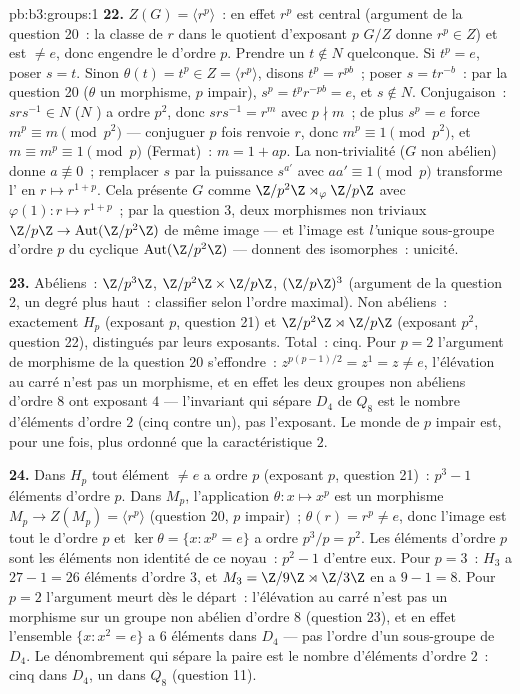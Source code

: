 \begin{solution}{pb:b3:groups:1}
\textbf{22.} $Z(G) = \langle r^p\rangle$~: en effet $r^p$ est
central (argument de la question 20~: la classe de $r$ dans le
quotient d'exposant $p$ $G/Z$ donne $r^p \in Z$) et est $\neq
e$, donc engendre le  d'ordre $p$. Prendre un $t \notin N$
quelconque. Si $t^p = e$, poser $s = t$. Sinon $\theta(t) =
t^p \in Z = \langle r^p\rangle$, disons $t^p = r^{pb}$~; poser
$s = tr^{-b}$~: par la question 20 ($\theta$ un morphisme, $p$
impair), $s^p = t^pr^{-pb} = e$, et $s \notin N$. Conjugaison~:
$srs^{-1} \in N$ ($N$ ) a ordre $p^2$, donc $srs^{-1} =
r^m$ avec $p \nmid m$~; de plus $s^p = e$ force $m^p \equiv m
\pmod{p^2}$ --- conjuguer $p$ fois renvoie $r$, donc $m^p
\equiv 1 \pmod{p^2}$, et $m \equiv m^p \equiv 1 \pmod p$
(Fermat)~: $m = 1 + ap$. La non-trivialité ($G$ non abélien)
donne $a \not\equiv 0$~; remplacer $s$ par la puissance
$s^{a'}$ avec $aa' \equiv 1 \pmod p$ transforme l' en $r
\mapsto r^{1+p}$. Cela présente $G$ comme
$\Z/p^2\Z\rtimes_\varphi\Z/p\Z$ avec $\varphi(1)\colon r
\mapsto r^{1+p}$~; par la question 3, deux morphismes non
triviaux $\Z/p\Z \to \operatorname{Aut}(\Z/p^2\Z)$ de même
image --- et l'image est \emph{l'}unique sous-groupe d'ordre $p$
du cyclique $\operatorname{Aut}(\Z/p^2\Z)$ --- donnent des
 isomorphes~: unicité.

\textbf{23.} Abéliens~: $\Z/p^3\Z$, $\Z/p^2\Z\times\Z/p\Z$,
$(\Z/p\Z)^3$ (argument de la question 2, un degré plus haut~:
classifier selon l'ordre maximal). Non abéliens~: exactement
$H_p$ (exposant $p$, question 21) et $\Z/p^2\Z\rtimes\Z/p\Z$
(exposant $p^2$, question 22), distingués par leurs exposants.
Total~: cinq. Pour $p = 2$ l'argument de morphisme de la
question 20 s'effondre~: $z^{p(p-1)/2} = z^{1} = z \neq e$,
l'élévation au carré n'est pas un morphisme, et en effet les
deux groupes non abéliens d'ordre $8$ ont exposant $4$ ---
l'invariant qui sépare $D_4$ de $Q_8$ est le nombre d'éléments
d'ordre $2$ (cinq contre un), pas l'exposant. Le monde de $p$
impair est, pour une fois, plus ordonné que la caractéristique
$2$.

\textbf{24.} Dans $H_p$ tout élément $\neq e$ a ordre $p$
(exposant $p$, question 21)~: $p^3 - 1$ éléments d'ordre $p$.
Dans $M_p$, l'application $\theta \colon x \mapsto x^p$ est un
morphisme $M_p \to Z(M_p) = \langle r^p\rangle$ (question 20,
$p$ impair)~; $\theta(r) = r^p \neq e$, donc l'image est tout le
 d'ordre $p$ et $\ker\theta = \{x : x^p = e\}$ a ordre
$p^3/p = p^2$. Les éléments d'ordre $p$ sont les éléments non
identité de ce noyau~: $p^2 - 1$ d'entre eux. Pour $p = 3$~:
$H_3$ a $27 - 1 = 26$ éléments d'ordre $3$, et $M_3 = \Z/9\Z
\rtimes \Z/3\Z$ en a $9 - 1 = 8$. Pour $p = 2$ l'argument meurt
dès le départ~: l'élévation au carré n'est pas un morphisme sur
un groupe non abélien d'ordre $8$ (question 23), et en effet
l'ensemble $\{x : x^2 = e\}$ a $6$ éléments dans $D_4$ --- pas
l'ordre d'un sous-groupe de $D_4$. Le dénombrement qui sépare la
paire est le nombre d'éléments d'ordre $2$~: cinq dans $D_4$, un
dans $Q_8$ (question 11).


\end{solution}
